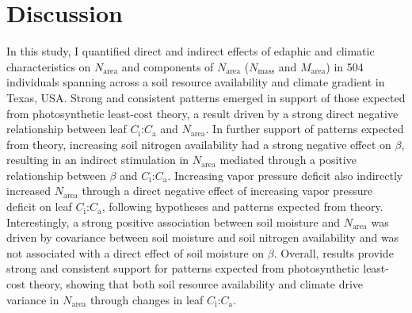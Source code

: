 \section{Discussion}
\noindent In this study, I quantified direct and indirect effects of edaphic and climatic characteristics on $N_\mathrm{area}$ and components of $N_\mathrm{area}$ ($N_\mathrm{mass}$ and $M_\mathrm{area}$) in 504 individuals spanning across a soil resource availability and climate gradient in Texas, USA. Strong and consistent patterns emerged in support of those expected from photosynthetic least-cost theory, a result driven by a strong direct negative relationship between leaf $C_\mathrm{i}$:$C_\mathrm{a}$ and $N_\mathrm{area}$. In further support of patterns expected from theory, increasing soil nitrogen availability had a strong negative effect on $\beta$, resulting in an indirect stimulation in $N_\mathrm{area}$ mediated through a positive relationship between $\beta$ and $C_\mathrm{i}$:$C_\mathrm{a}$. Increasing vapor pressure deficit also indirectly increased $N_\mathrm{area}$ through a direct negative effect of increasing vapor pressure deficit on leaf $C_\mathrm{i}$:$C_\mathrm{a}$, following hypotheses and patterns expected from theory. Interestingly, a strong positive association between soil moisture and $N_\mathrm{area}$ was driven by covariance between soil moisture and soil nitrogen availability and was not associated with a direct effect of soil moisture on $\beta$. Overall, results provide strong and consistent support for patterns expected from photosynthetic least-cost theory, showing that both soil resource availability and climate drive variance in $N_\mathrm{area}$ through changes in leaf $C_\mathrm{i}$:$C_\mathrm{a}$.

